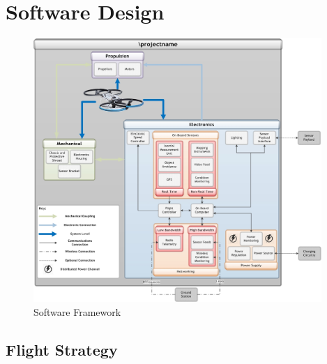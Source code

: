 \chapter{Software Design}

	\begin{figure}[H]
		\centering
		\includegraphics[height = 10cm]{../Design/System/SystemArchitecture/SystemArchitecture.jpg}
		\caption{Software Framework}
		\label{IM_SoftwareArchitectureExpanded}
	\end{figure}


	\section{Flight Strategy}